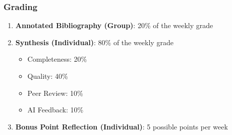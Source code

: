 \documentclass[12pt, letterpaper]{article}
\begin{document}
\subsubsection*{Grading}
    \begin{enumerate}
        \item \textbf{Annotated Bibliography (Group)}: 20\% of the weekly grade
        \item \textbf{Synthesis (Individual)}: 80\% of the weekly grade
            \begin{itemize}
                \item Completeness: 20\%
                \item Quality: 40\%
                \item Peer Review: 10\%
                \item AI Feedback: 10\%
            \end{itemize}
        \item \textbf{Bonus Point Reflection (Individual)}: 5 possible points per week
    \end{enumerate} 
\end{document}
